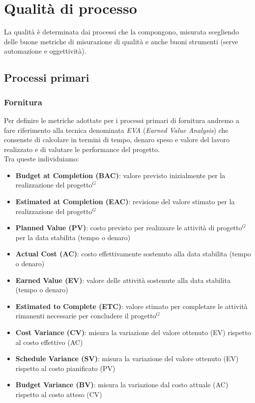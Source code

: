 \documentclass[a4paper,10pt]{article}
\begin{document}
\section{Qualità di processo}
La qualità è determinata dai processi che la compongono, misurata scegliendo delle buone metriche di misurazione di qualità e anche buoni strumenti (serve automazione e oggettività). 
\subsection{Processi primari}
\subsubsection{Fornitura}
Per definire le metriche adottate per i processi primari di fornitura andremo a fare riferimento alla tecnica denominata \textit{EVA} (\textit{Earned Value Analysis}) che consenste di calcolare in termini di tempo, denaro speso e valore del lavoro realizzato e di valutare le performance del progetto.\\ Tra queste individuiamo:
\begin{itemize}
    \item \textbf{Budget at Completion (BAC)}: valore previsto inizialmente per la realizzazione del progetto$^G$
    \item \textbf{Estimated at Completion (EAC)}: revisione del valore stimato per la realizzazione del progetto$^G$
    \item \textbf{Planned Value (PV)}: costo previsto per realizzare le attività di progetto$^G$ per la data stabilita (tempo o denaro)
    \item \textbf{Actual Cost (AC)}: costo effettivamente sostenuto alla data stabilita (tempo o denaro)
    \item \textbf{Earned Value (EV)}: valore delle attività sostenute alla data stabilita (tempo o denaro)
    \item \textbf{Estimated to Complete (ETC)}: valore stimato per completare le attività rimanenti necessarie per concludere il progetto$^G$
    \item \textbf{Cost Variance (CV)}: misura la variazione del valore ottenuto (EV) rispetto al costo effettivo (AC)
    \item \textbf{Schedule Variance (SV)}: misura la variazione del valore ottenuto (EV) rispetto al costo pianificato (PV)
    \item \textbf{Budget Variance (BV)}: misura la variazione dal costo attuale (AC) rispetto al costo atteso (CV)
\end{itemize}
\end{document}
